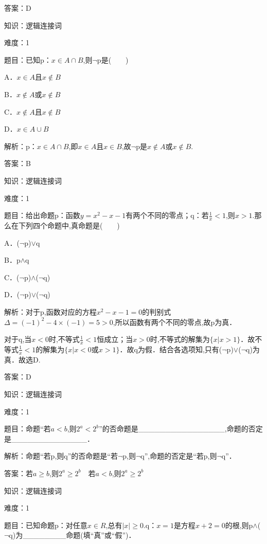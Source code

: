 \documentclass{article} %
\begin{document}
答案：D



知识：逻辑连接词

难度：1

题目：已知p：$x\in A\cap B$,则$\neg$p是(　　)

A．$x\in A$且$x\notin B$   

B．$x \notin A$或$x\notin B$

C．$x\notin A$且$x \notin B$   

D．$x\in A\cup B$

解析：p：$x\in A \cap B$,即$x\in A$且$x\in B$,故$\neg$p是$x\notin A$或$x\notin B$.

答案：B



知识：逻辑连接词

难度：1

题目：给出命题p：函数$y=x^{2}-x-1$有两个不同的零点；q：若$\frac{1}{x}{<}1$,则$x{>}1$.那么在下列四个命题中,真命题是(　　)

A．($\neg$p)${\vee}$q   

B．p${\wedge}$q

C．($\neg$p)${\wedge}$($\neg$q)   

D．($\neg$p)${\vee}$($\neg$q)

解析：对于p,函数对应的方程$x^{2}-x-1=0$的判别式$\Delta=(-1)^{2}-4\times(-1)=5>0$,所以函数有两个不同的零点,故p为真．

对于q,当$x{<}0$时,不等式$\frac{1}{x}{<}1$恒成立；当$x{>}0$时,不等式的解集为$\{x|x>1 \}$．故不等式$\frac{1}{x}{<}1$的解集为$\{x|x<0或x>1 \}$．故q为假．结合各选项知,只有($\neg$p)${\vee}$($\neg$q)为真．故选D.

答案：D



知识：逻辑连接词

难度：1

题目：命题``若$a{<}b$,则$2^{a}{<}2^{b}$''的否命题是\_\_\_\_\_\_\_\_\_\_\_\_\_\_\_\_,命题的否定是\_\_\_\_\_\_\_\_\_\_\_\_\_\_．

解析：命题``若p,则q''的否命题是``若$\neg$p,则$\neg$q'',命题的否定是``若p,则$\neg$q''．

答案：若$a{\ge}b$,则$2^{a}{\ge}2^{b}$　若$a{<}b$,则$2^{a}{\ge}2^{b}$



知识：逻辑连接词

难度：1

题目：已知命题p：对任意$x{\in}R$,总有$|x|\ge 0$.q：$x=1$是方程$x+2=0$的根,则p${\wedge}$($\neg$q)为\_\_\_\_\_\_\_\_命题(填``真''或``假'')．
\end{document}
